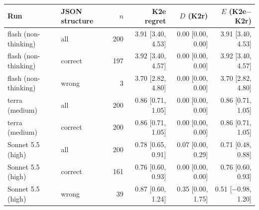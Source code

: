 \begin{tabular}{@{}llrrrr@{}}
\toprule
Run & JSON structure & $n$ & K2e regret & $D$ (K2r) & $E$ (K2e$-$K2r) \\
\midrule
flash (non-thinking) & all & 200 & 3.91 [3.40, 4.53] & 0.00 [0.00, 0.00] & 3.91 [3.40, 4.53] \\
flash (non-thinking) & correct & 197 & 3.92 [3.40, 4.57] & 0.00 [0.00, 0.00] & 3.92 [3.40, 4.57] \\
flash (non-thinking) & wrong & 3 & 3.70 [2.82, 4.80] & 0.00 [0.00, 0.00] & 3.70 [2.82, 4.80] \\
terra (medium) & all & 200 & 0.86 [0.71, 1.05] & 0.00 [0.00, 0.00] & 0.86 [0.71, 1.05] \\
terra (medium) & correct & 200 & 0.86 [0.71, 1.05] & 0.00 [0.00, 0.00] & 0.86 [0.71, 1.05] \\
Sonnet 5.5 (high) & all & 200 & 0.78 [0.65, 0.91] & 0.07 [0.00, 0.29] & 0.71 [0.48, 0.88] \\
Sonnet 5.5 (high) & correct & 161 & 0.76 [0.60, 0.93] & 0.00 [0.00, 0.00] & 0.76 [0.60, 0.93] \\
Sonnet 5.5 (high) & wrong & 39 & 0.87 [0.60, 1.24] & 0.35 [0.00, 1.75] & 0.51 [$-$0.98, 1.20] \\
\bottomrule
\end{tabular}
